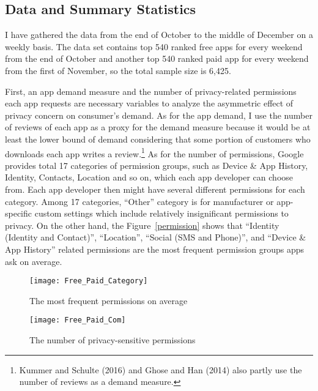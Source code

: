 \documentclass[12pt]{article}
\begin{document}
\subsection{Data and Summary Statistics}

I have gathered the data from the end of October to the middle of December on a weekly basis. The data set contains top 540 ranked free apps for every weekend from the end of October and another top 540 ranked paid app for every weekend from the first of November, so the total sample size is 6,425.

First, an app demand measure and the number of privacy-related permissions each app requests are necessary variables to analyze the asymmetric effect of privacy concern on consumer's demand. As for the app demand, I use the number of reviews of each app as a proxy for the demand measure because it would be at least the lower bound of demand considering that some portion of customers who downloads each app writes a review.\footnote{Kummer and Schulte (2016) and Ghose and Han (2014) also partly use the number of reviews as a demand measure.} As for the number of permissions, Google provides total 17 categories of permission groups, such as Device \& App History, Identity, Contacts, Location and so on, which each app developer can choose from. Each app developer then might have several different permissions for each category. Among 17 categories, ``Other'' category is for manufacturer or app-specific custom settings which include relatively insignificant permissions to privacy. On the other hand,  the Figure~\ref{permission} shows that ``Identity (Identity and Contact)'', ``Location'', ``Social (SMS and Phone)'', and ``Device \& App History'' related permissions are the most frequent permission groups apps ask on average. %
			\begin{figure}[!tbp]
	\centering
	\begin{minipage}[b]{0.46\textwidth}
		\texttt{[image: Free\_Paid\_Category]}
		\caption{The most frequent permissions on average}\label{permission}
	\end{minipage}
	\hfill
	\begin{minipage}[b]{0.46\textwidth}
		\texttt{[image: Free\_Paid\_Com]}
		\caption{The number of privacy-sensitive permissions}\label{freepaidpermission}
	\end{minipage}
\end{figure}
\end{document}
